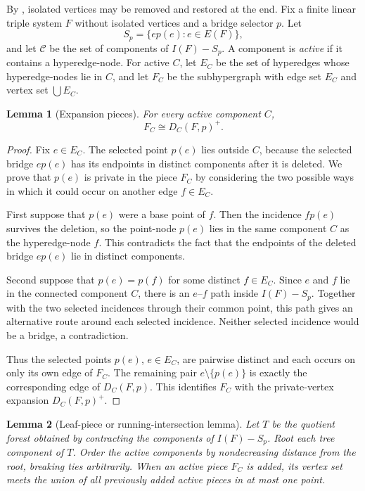 \documentclass[11pt]{amsart}
\newtheorem{lemma}[lemma]{Lemma}
\theoremstyle{definition}
\theoremstyle{remark}
\numberwithin{equation}{section}
\begin{document}
By , isolated vertices may be removed and
restored at the end.  Fix a finite linear triple system $F$ without
isolated vertices and a bridge selector $p$.  Let
\[
 S_p=\{ep(e):e\in E(F)\},
\]
and let $\mathcal C$ be the set of components of $I(F)-S_p$.  A component
is \emph{active} if it contains a hyperedge-node.  For active $C$, let
$E_C$ be the set of hyperedges whose hyperedge-nodes lie in $C$, and let
$F_C$ be the subhypergraph with edge set $E_C$ and vertex set
$\bigcup E_C$.

\begin{lemma}[Expansion pieces]
\label{lem:expansion-piece}
For every active component $C$,
\[
 F_C\cong D_C(F,p)^+.
\]
\end{lemma}

\begin{proof}
Fix $e\in E_C$.  The selected point $p(e)$ lies outside $C$, because the
selected bridge $ep(e)$ has its endpoints in distinct components after
it is deleted.  We prove that $p(e)$ is private in the piece $F_C$ by
considering the two possible ways in which it could occur on another
edge $f\in E_C$.

First suppose that $p(e)$ were a base point of $f$.  Then the incidence
$fp(e)$ survives the deletion, so the point-node $p(e)$ lies in the same
component $C$ as the hyperedge-node $f$.  This contradicts the fact that
the endpoints of the deleted bridge $ep(e)$ lie in distinct components.

Second suppose that $p(e)=p(f)$ for some distinct $f\in E_C$.  Since
$e$ and $f$ lie in the connected component $C$, there is an $e$--$f$
path inside $I(F)-S_p$.  Together with the two selected incidences
through their common point, this path gives an alternative route around
each selected incidence.  Neither selected incidence would be a bridge,
a contradiction.

Thus the selected points $p(e)$, $e\in E_C$, are pairwise distinct and
each occurs on only its own edge of $F_C$.  The remaining pair
$e\setminus\{p(e)\}$ is exactly the corresponding edge of
$D_C(F,p)$.  This identifies $F_C$ with the private-vertex expansion
$D_C(F,p)^+$.
\end{proof}

\begin{lemma}[Leaf-piece or running-intersection lemma]
\label{lem:leaf-piece}
Let $T$ be the quotient forest obtained by contracting the components of
$I(F)-S_p$.  Root each tree component of $T$.  Order the active
components by nondecreasing distance from the root, breaking ties
arbitrarily.  When an active piece $F_C$ is added, its vertex set meets
the union of all previously added active pieces in at most one point.
\end{lemma}
\end{document}
